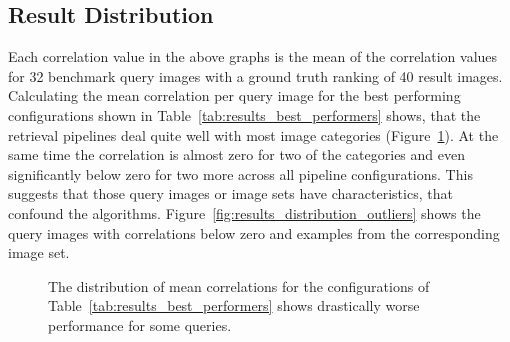 \subsection{Result Distribution}\label{sec:results_distribution}

Each correlation value in the above graphs is the mean of the correlation
values for 32 benchmark query images with a ground truth ranking of 40 result
images. Calculating the mean correlation per query image for the best
performing configurations shown in Table~\ref{tab:results_best_performers}
shows, that the retrieval pipelines deal quite well with most image categories
(Figure~\ref{fig:results_distribution}). At the same time the correlation is
almost zero for two of the categories and even significantly below zero for two
more across all pipeline configurations. This suggests that those query images
or image sets have characteristics, that confound the algorithms.
Figure~\ref{fig:results_distribution_outliers} shows the query images with
correlations below zero and examples from the corresponding image set.

\begin{figure}[h]
    \centering
    
    \caption[Distribution of results]{
        The distribution of mean correlations for the configurations of
        Table~\ref{tab:results_best_performers} shows drastically worse
        performance for some queries.
    }
    \label{fig:results_distribution}
\end{figure}

